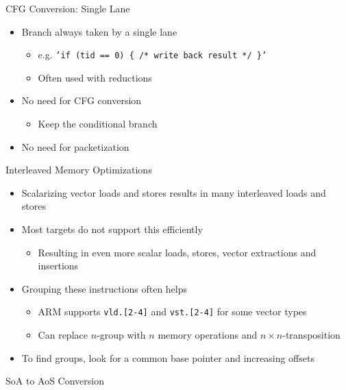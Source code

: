 
\begin{frame}{CFG Conversion: Single Lane}

\begin{itemize}
    \item Branch always taken by a single lane
    \begin{itemize}
        \item e.g. \texttt{'if (tid == 0) \{ /* write back result */ \}'}
        \item Often used with reductions
    \end{itemize}
    \item No need for CFG conversion
    \begin{itemize}
        \item Keep the conditional branch
    \end{itemize}
    \item No need for packetization
\end{itemize}

\end{frame}


\begin{frame}{Interleaved Memory Optimizations}

\begin{itemize}
    \item Scalarizing vector loads and stores results in many interleaved loads and stores
    \item Most targets do not support this efficiently
    \begin{itemize}
        \item Resulting in even more scalar loads, stores, vector extractions and insertions
    \end{itemize}
    \item Grouping these instructions often helps
    \begin{itemize}
        \item ARM supports \texttt{vld.[2-4]} and \texttt{vst.[2-4]} for some vector types
        \item Can replace $n$-group with $n$ memory operations and $n \times n$-transposition 
    \end{itemize}
    \item To find groups, look for a common base pointer and increasing offsets
\end{itemize}


\end{frame}


\begin{frame}{SoA to AoS Conversion}

\end{frame}
